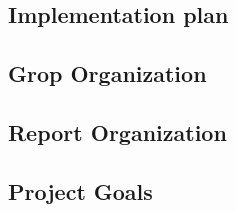 \subsection{Implementation plan}

\subsection{Grop Organization}

\subsection{Report Organization}

\subsection{Project Goals}



